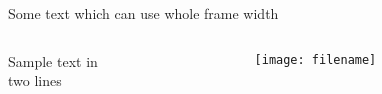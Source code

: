 \documentclass[demo]{beamer}%
\begin{document}
\begin{frame}
  Some text which can use whole frame width
  \begin{columns}[t]
    \begin{column}{5cm}
      Sample text in\\
      two lines
    \end{column}
    \begin{column}[T]{4cm}
      \texttt{[image: filename]}
    \end{column}
  \end{columns}
\end{frame}
\end{document}

